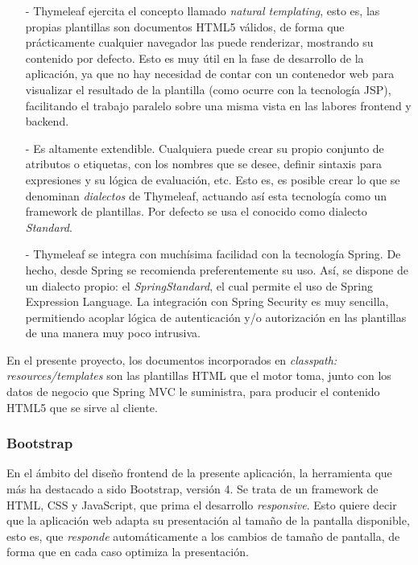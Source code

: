 \documentclass[a4paper]{article}
\begin{document}
    \begin{itemize}
    	\item[-] Thymeleaf ejercita el concepto llamado \emph{natural templating}, esto es, las propias plantillas son documentos HTML5 válidos, de forma que prácticamente cualquier navegador las puede renderizar, mostrando su contenido por defecto. Esto es muy útil en la fase de desarrollo de la aplicación, ya que no hay necesidad de contar con un contenedor web para visualizar el resultado de la plantilla (como ocurre con la tecnología JSP), facilitando el trabajo paralelo sobre una misma vista en las labores frontend y backend.
    	\item[-] Es altamente extendible. Cualquiera puede crear su propio conjunto de atributos o etiquetas, con los nombres que se desee, definir sintaxis para expresiones y su lógica de evaluación, etc. Esto es, es posible crear lo que se denominan \emph{dialectos} de Thymeleaf, actuando así esta tecnología como un framework de plantillas. Por defecto se usa el conocido como dialecto \emph{Standard}.
    	\item[-] Thymeleaf se integra con muchísima facilidad con la tecnología Spring. De hecho, desde Spring se recomienda preferentemente su uso. Así, se dispone de un dialecto propio: el \emph{SpringStandard}, el cual permite el uso de Spring Expression Language. La integración con Spring Security es muy sencilla, permitiendo acoplar lógica de autenticación y/o autorización en las plantillas de una manera muy poco intrusiva.
    \end{itemize}

	En el presente proyecto, los documentos incorporados en \emph{classpath: resources/templates} son las plantillas HTML que el motor toma, junto con los datos de negocio que Spring MVC le suministra, para producir el contenido HTML5 que se sirve al cliente.
    
    \subsubsection{Bootstrap}
    En el ámbito del diseño frontend de la presente aplicación, la herramienta que más ha destacado a sido Bootstrap, versión 4. Se trata de un framework de HTML, CSS y JavaScript, que prima el desarrollo \emph{responsive}. Esto quiere decir que la aplicación web adapta su presentación al tamaño de la pantalla disponible, esto es, que \emph{responde} automáticamente a los cambios de tamaño de pantalla, de forma que en cada caso optimiza la presentación.
    
\end{document}

